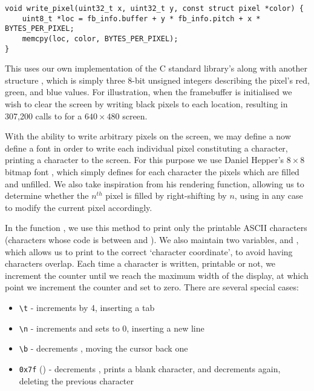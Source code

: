         \lstset{language=c}
        \begin{lstlisting}[caption={Implementation of \code{write\_pixel}},captionpos=b]
void write_pixel(uint32_t x, uint32_t y, const struct pixel *color) {
    uint8_t *loc = fb_info.buffer + y * fb_info.pitch + x * BYTES_PER_PIXEL;
    memcpy(loc, color, BYTES_PER_PIXEL);
}
        \end{lstlisting}

        This uses our own implementation of the C standard library's
         along with another structure , which is
        simply three 8-bit unsigned integers describing the pixel's red, green,
        and blue values. For illustration, when the framebuffer is initialised
        we wish to clear the screen by writing black pixels to each location,
        resulting in 307,200 calls to  for a $640\times480$
        screen.

        With the ability to write arbitrary pixels on the screen, we
        may define a now define a font in order to write each individual pixel
        constituting a character, printing a character to the screen. For this
        purpose we use Daniel Hepper's $8\times8$ bitmap font \cite{DHepper},
        which simply defines for each character the pixels which are filled and
        unfilled. We also take inspiration from his rendering function, allowing
        us to determine whether the $n^{th}$ pixel is filled by right-shifting
        by $n$, using  in any case to modify the current
        pixel accordingly.

        In the function , we use this method to print only the
        printable ASCII characters (characters whose code is between 
        and ). We also maintain two variables,  and
        , which allows us to print to the correct `character
        coordinate', to avoid having characters overlap. Each time a character
        is written, printable or not, we increment the  counter until
        we reach the maximum width of the display, at which point we increment
        the  counter and set  to zero. There are several
        special cases:
        \begin{itemize}
            \itemsep0em
            \item \verb|\t| - increments  by 4, inserting a tab
            \item \verb|\n| - increments  and sets  to
                0, inserting a new line
            \item \verb|\b| - decrements , moving the cursor back
                one
            \item \verb|0x7f| () - decrements , prints a
                blank character, and decrements  again, deleting
                the previous character
        \end{itemize}

